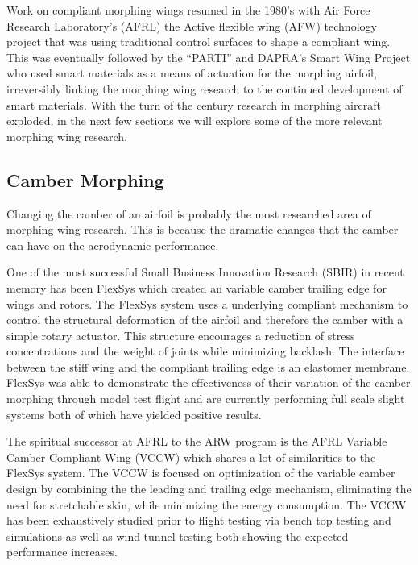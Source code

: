 \documentclass[11pt]{ucthesis}
\begin{document}
Work on compliant morphing wings resumed in the 1980's with Air Force Research Laboratory's (AFRL) the Active flexible wing (AFW) technology project that was using traditional control surfaces to shape a compliant wing. \cite{miller1988active} This was eventually followed by the ``PARTI'' \cite{pinkerton1996controlled} and DAPRA's Smart Wing Project \cite{kudva2001overview} who used smart materials as a means of actuation for the morphing airfoil, irreversibly linking the morphing wing research to the continued development of smart materials. With the turn of the century research in morphing aircraft exploded, in the next few sections we will explore some of the more relevant morphing wing research.

\subsection{Camber Morphing}
Changing the camber of an airfoil is probably the most researched area of morphing wing research. This is because the dramatic changes that the camber can have on the aerodynamic performance. 

One of the most successful Small Business Innovation Research (SBIR) in recent memory has been FlexSys which created an variable camber trailing edge for  wings\cite{kota2009mission} and rotors\cite{kota2008adaptive}. The FlexSys system uses a underlying compliant mechanism to control the structural deformation of the airfoil and therefore the camber with a simple rotary actuator. This structure encourages a reduction of stress concentrations  and the weight  of joints while minimizing backlash. The interface between the stiff wing and the compliant trailing edge is an elastomer membrane. FlexSys was able to demonstrate the effectiveness of their variation of the camber morphing through model test flight and are currently performing full scale slight systems both of which have yielded positive results. 

The spiritual successor at AFRL to the ARW program is the AFRL Variable Camber Compliant Wing (VCCW) which shares a lot of similarities to the FlexSys system. The VCCW is focused on optimization of the variable camber design by combining the the leading and trailing edge mechanism, eliminating the need for stretchable skin, while minimizing the energy consumption. The VCCW has been exhaustively studied prior to flight testing via bench top testing and simulations \cite{miller2015fluid} as well as wind tunnel testing \cite{zientarski2015wind} both showing the expected performance increases. 
\end{document}
